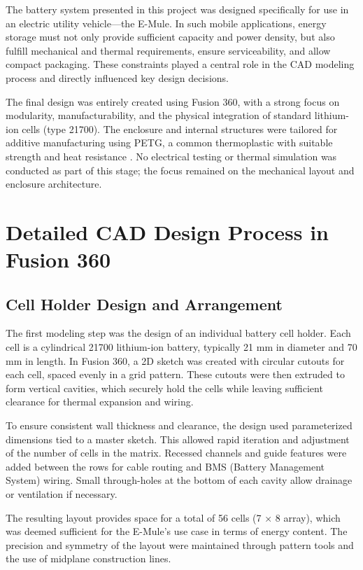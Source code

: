 The battery system presented in this project was designed specifically for use in an electric utility vehicle—the E-Mule. In such mobile applications, energy storage must not only provide sufficient capacity and power density, but also fulfill mechanical and thermal requirements, ensure serviceability, and allow compact packaging. These constraints played a central role in the CAD modeling process and directly influenced key design decisions.

The final design was entirely created using Fusion 360, with a strong focus on modularity, manufacturability, and the physical integration of standard lithium-ion cells (type 21700). The enclosure and internal structures were tailored for additive manufacturing using PETG, a common thermoplastic with suitable strength and heat resistance \cite{gebhardt2016}. No electrical testing or thermal simulation was conducted as part of this stage; the focus remained on the mechanical layout and enclosure architecture.

\section{Detailed CAD Design Process in Fusion 360}

\subsection{Cell Holder Design and Arrangement}

The first modeling step was the design of an individual battery cell holder. Each cell is a cylindrical 21700 lithium-ion battery, typically 21 mm in diameter and 70 mm in length. In Fusion 360, a 2D sketch was created with circular cutouts for each cell, spaced evenly in a grid pattern. These cutouts were then extruded to form vertical cavities, which securely hold the cells while leaving sufficient clearance for thermal expansion and wiring.

To ensure consistent wall thickness and clearance, the design used parameterized dimensions tied to a master sketch. This allowed rapid iteration and adjustment of the number of cells in the matrix. Recessed channels and guide features were added between the rows for cable routing and BMS (Battery Management System) wiring. Small through-holes at the bottom of each cavity allow drainage or ventilation if necessary.

The resulting layout provides space for a total of 56 cells (7 × 8 array), which was deemed sufficient for the E-Mule’s use case in terms of energy content. The precision and symmetry of the layout were maintained through pattern tools and the use of midplane construction lines.

